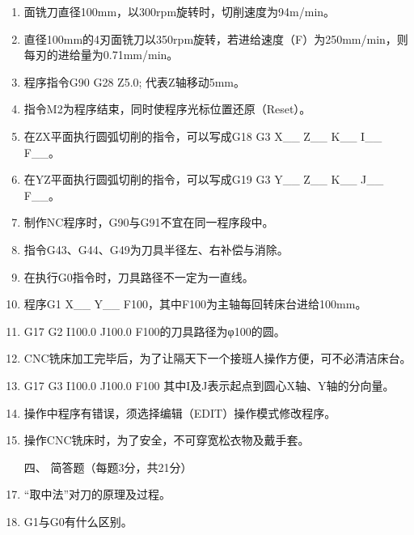 \documentclass[12pt,twocolumn,landscape,UTF8,twoside]{ctexart}
\begin{document}
\begin{spacing}{1.3}
\begin{enumerate} [1、]
\item 面铣刀直径100mm，以300rpm旋转时，切削速度为94m/min。
\item 直径100mm的4刃面铣刀以350rpm旋转，若进给速度（F）为250mm/min，则每刃的进给量为0.71mm/min。
\item 程序指令G90 G28 Z5.0; 代表Z轴移动5mm。
\item 指令M2为程序结束，同时使程序光标位置还原（Reset）。
\item 在ZX平面执行圆弧切削的指令，可以写成G18 G3 X\_\_ Z\_\_ K\_\_ I\_\_ F\_\_。
\item 在YZ平面执行圆弧切削的指令，可以写成G19 G3 Y\_\_ Z\_\_ K\_\_ J\_\_ F\_\_。
\item 制作NC程序时，G90与G91不宜在同一程序段中。
\item 指令G43、G44、G49为刀具半径左、右补偿与消除。
\item 在执行G0指令时，刀具路径不一定为一直线。
\item 程序G1 X\_\_ Y\_\_ F100，其中F100为主轴每回转床台进给100mm。
\item G17 G2 I100.0 J100.0 F100的刀具路径为φ100的圆。
\item CNC铣床加工完毕后，为了让隔天下一个接班人操作方便，可不必清洁床台。
\item G17 G3 I100.0 J100.0 F100 其中I及J表示起点到圆心X轴、Y轴的分向量。
\item 操作中程序有错误，须选择编辑（EDIT）操作模式修改程序。
\item 操作CNC铣床时，为了安全，不可穿宽松衣物及戴手套。
	
		
\item[\heiti 四、] {\heiti 简答题（每题3分，共21分）}

\item “取中法”对刀的原理及过程。
	
\item G1与G0有什么区别。
	

\end{enumerate}
\end{spacing}
\end{document}
